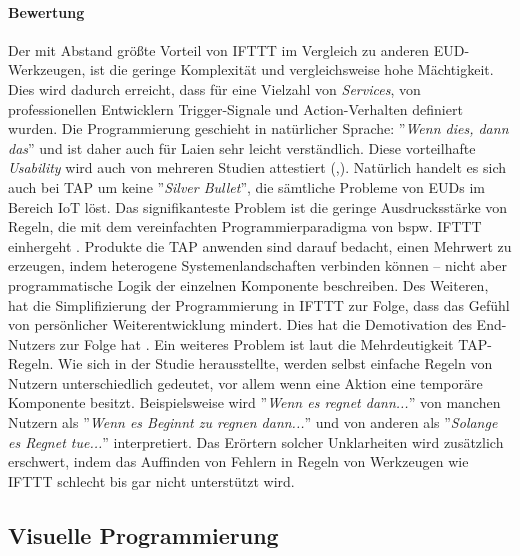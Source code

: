 \paragraph{Bewertung} Der mit Abstand größte Vorteil von IFTTT im Vergleich zu anderen \ac{EUD}-Werkzeugen, ist die geringe Komplexität und vergleichsweise hohe Mächtigkeit. Dies wird dadurch erreicht, dass für eine Vielzahl von \textit{Services}, von professionellen Entwicklern Trigger-Signale und Action-Verhalten definiert wurden. Die Programmierung geschieht in natürlicher Sprache: ''\textit{Wenn dies, dann das}'' und ist daher auch für Laien sehr leicht verständlich. Diese vorteilhafte \textit{Usability} wird auch von mehreren Studien attestiert (\cite{huang2015supporting},\cite{ur2014practical}). 
Natürlich handelt es sich auch bei \ac{TAP} um keine ''\textit{Silver Bullet}'', die sämtliche Probleme von \acp{EUD} im Bereich \ac{IoT} löst. Das signifikanteste Problem ist die geringe Ausdrucksstärke von Regeln, die mit dem vereinfachten Programmierparadigma von bspw. IFTTT einhergeht \cite{ur2016trigger}. Produkte die \ac{TAP} anwenden sind darauf bedacht, einen Mehrwert zu erzeugen, indem heterogene Systemenlandschaften verbinden können -- nicht aber programmatische Logik der einzelnen Komponente beschreiben. Des Weiteren, hat die Simplifizierung der Programmierung in IFTTT zur Folge, dass das Gefühl von persönlicher Weiterentwicklung mindert. Dies hat die Demotivation des End-Nutzers zur Folge hat \cite{ur2016trigger}. Ein weiteres Problem ist laut \cite{huang2015supporting} die Mehrdeutigkeit \ac{TAP}-Regeln. Wie sich in der Studie herausstellte, werden selbst einfache Regeln von Nutzern unterschiedlich gedeutet, vor allem wenn eine Aktion eine temporäre Komponente besitzt. Beispielsweise wird ''\textit{Wenn es regnet dann...}'' von manchen Nutzern als ''\textit{Wenn es Beginnt zu regnen dann...}'' und von anderen als ''\textit{Solange es Regnet tue...}'' interpretiert. Das Erörtern solcher Unklarheiten wird zusätzlich erschwert, indem das Auffinden von Fehlern in Regeln von Werkzeugen wie IFTTT schlecht bis gar nicht unterstützt wird.

\subsection{Visuelle Programmierung}\label{subsubsec:samlabs}

